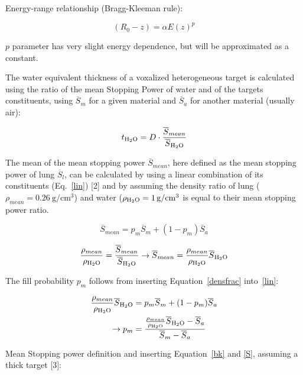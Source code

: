 \documentclass{article}
\begin{document}
Energy-range relationship (Bragg-Kleeman rule):

\begin{equation}
    \label{bk}
    (R_0-z)=\alpha E(z)^p
\end{equation}

$p$ parameter has very slight energy dependence, but will be approximated as a constant.

The water equivalent thickness of a voxalized heterogeneous target is calculated using the ratio of the mean Stopping Power of water and of the targets constituents, using $\overline{S}_m$ for a given material and $\overline{S}_a$ for another material (usually air): 

\begin{equation}
    \label{t}
    t_{\ce{H2O}}=D\cdot \frac{\overline{S}_{mean}}{\overline{S}_{\ce{H2O}}}
\end{equation}

The mean of the mean stopping power $\overline{S}_{mean}$, here defined as the mean stopping power of lung $\overline{S}_l$, can be calculated by using a linear combination of its constituents (Eq.~\ref{lin}) [2] and by assuming the density ratio of lung ($\rho_{mean}=\SI{0.26}{\gram\per\centi\meter\cubed}$) and water ($\rho_{\ce{H2O}}=\SI{1}{\gram\per\centi\meter\cubed}$ is equal to their mean stopping power ratio.

\begin{equation}
    \label{lin}
    \overline{S}_{mean} = p_m \overline{S}_m+(1-p_m) \overline{S}_a
\end{equation}

\begin{equation}
    \label{densfrac}
    \frac{\rho_{mean}}{ \rho_{\ce{H2O}}} = \frac{\overline{S}_{mean}}{\overline{S}_{\ce{H2O}}} \rightarrow{} \overline{S}_{mean} = \frac{\rho_{mean}}{\rho_{\ce{H2O}}}\overline{S}_{\ce{H2O}}
\end{equation}

The fill probability $p_m$ follows from inserting Equation~\ref{densfrac} into~\ref{lin}:

\begin{align}
    \frac{\rho_{mean}}{\rho_{\ce{H2O}}}\overline{S}_{\ce{H2O}} &= p_m \overline{S}_m+(1-p_m) \overline{S}_a\\
    \rightarrow{} p_m &= \frac{\frac{\rho_{mean}}{\rho_{\ce{H2O}}}\overline{S}_{\ce{H2O}} - \overline{S}_a}{\overline{S}_m - \overline{S}_a}
\end{align}

Mean Stopping power definition and inserting Equation~\ref{bk} and \ref{S}, assuming a thick target [3]:
\end{document}
